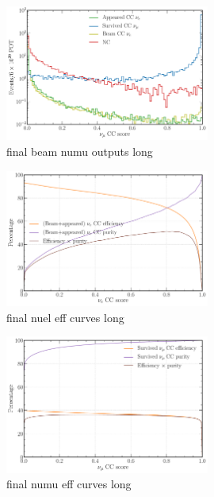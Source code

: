 \begin{figure} %
    \includegraphics[width=0.6\textwidth]{diagrams/7-cvn/chipsnet/final_beam_numu_outputs.pdf}
    \caption[final beam numu outputs short]
    {final beam numu outputs long}
    \label{fig:final_beam_numu_outputs}
\end{figure}

\begin{figure} %
    \includegraphics[width=0.6\textwidth]{diagrams/7-cvn/chipsnet/final_nuel_eff_curves.pdf}
    \caption[final nuel eff curves short]
    {final nuel eff curves long}
    \label{fig:final_nuel_eff_curves}
\end{figure}

\begin{figure} %
    \includegraphics[width=0.6\textwidth]{diagrams/7-cvn/chipsnet/final_numu_eff_curves.pdf}
    \caption[final numu eff curves short]
    {final numu eff curves long}
    \label{fig:final_numu_eff_curves}
\end{figure}

